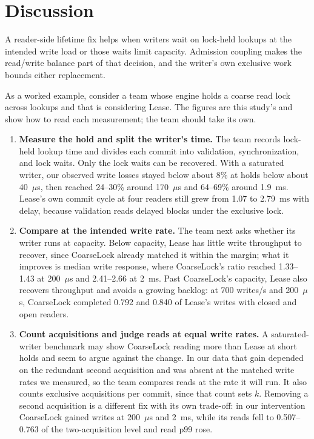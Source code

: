 \documentclass[conference]{IEEEtran}
\begin{document}
\section{Discussion}
A reader-side lifetime fix helps when writers wait on lock-held lookups at the intended write load or those waits limit capacity. Admission coupling makes the read/write balance part of that decision, and the writer's own exclusive work bounds either replacement.

As a worked example, consider a team whose engine holds a coarse read lock across lookups and that is considering Lease. The figures are this study's and show how to read each measurement; the team should take its own.
\begin{enumerate}
\item \textbf{Measure the hold and split the writer's time.} The team records lock-held lookup time and divides each commit into validation, synchronization, and lock waits. Only the lock waits can be recovered. With a saturated writer, our observed write losses stayed below about 8\% at holds below about 40~$\mu$s, then reached 24--30\% around 170~$\mu$s and 64--69\% around 1.9~ms. Lease's own commit cycle at four readers still grew from 1.07 to 2.79~ms with delay, because validation reads delayed blocks under the exclusive lock.
\item \textbf{Compare at the intended write rate.} The team next asks whether its writer runs at capacity. Below capacity, Lease has little write throughput to recover, since CoarseLock already matched it within the margin; what it improves is median write response, where CoarseLock's ratio reached 1.33--1.43 at 200~$\mu$s and 2.41--2.66 at 2~ms. Past CoarseLock's capacity, Lease also recovers throughput and avoids a growing backlog: at 700 writes/s and 200~$\mu$s, CoarseLock completed 0.792 and 0.840 of Lease's writes with closed and open readers.
\item \textbf{Count acquisitions and judge reads at equal write rates.} A saturated-writer benchmark may show CoarseLock reading more than Lease at short holds and seem to argue against the change. In our data that gain depended on the redundant second acquisition and was absent at the matched write rates we measured, so the team compares reads at the rate it will run. It also counts exclusive acquisitions per commit, since that count sets $k$. Removing a second acquisition is a different fix with its own trade-off: in our intervention CoarseLock gained writes at 200~$\mu$s and 2~ms, while its reads fell to 0.507--0.763 of the two-acquisition level and read p99 rose.

\end{enumerate}
\end{document}
